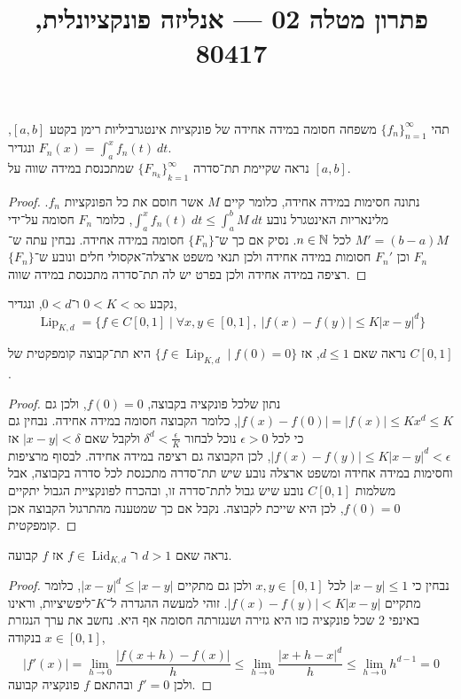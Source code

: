 
\title{פתרון מטלה 02 --- אנליזה פונקציונלית, 80417}


\maketitle
\maketitleprint{}

\question{}
תהי ${\{ f_n \}}_{n = 1}^\infty$ משפחה חסומה במידה אחידה של פונקציות אינטגרביליות רימן בקטע $[a, b]$, ונגדיר $F_n(x) = \int_{a}^{x} f_n(t)\ dt$. \\
נראה שקיימת תת־סדרה ${\{ F_{n_k} \}}_{k = 1}^\infty$ שמתכנסת במידה שווה על $[a, b]$.
\begin{proof}
	נתונה חסימות במידה אחידה, כלומר קיים $M$ אשר חוסם את כל הפונקציות $f_n$.
	מלינאריות האינטגרל נובע $\int_a^x f_n(t)\ dt \le \int_a^b M\ dt$, כלומר $F_n$ חסומה על־ידי $M' = (b - a)M$ לכל $n \in \mathbb{N}$.
	נסיק אם כך ש־$\{ F_n \}$ חסומה במידה אחידה.
	נבחין עתה ש־$F_n$ וכן $F_n'$ חסומות במידה אחידה ולכן תנאי משפט ארצלה־אקסולי חלים ונובע ש־$\{ F_n \}$ רציפה במידה אחידה ולכן בפרט יש לה תת־סדרה מתכנסת במידה שווה.
\end{proof}

\question{}
נקבע $0 < K < \infty$ ו־$0 < d$, ונגדיר,
\[
	\operatorname{Lip}_{K, d}
	= \{ f \in C[0, 1] \mid \forall x, y \in [0, 1],\ |f(x) - f(y)| \le K {|x - y|}^d \}  
\] 

\subquestion{}
נראה שאם $d \le 1$, אז $\{ f \in \operatorname{Lip}_{K, d} \mid f(0) = 0 \}$ היא תת־קבוצה קומפקטית של $C[0, 1]$.
\begin{proof}
	נתון שלכל פונקציה בקבוצה, $f(0) = 0$, ולכן גם $|f(x) - f(0)| = |f(x)| \le K x^d \le K$, כלומר הקבוצה חסומה במידה אחידה.
	נבחין גם כי לכל $\epsilon > 0$ נוכל לבחור $\delta^d < \frac{\epsilon}{K}$ ולקבל שאם $|x - y| < \delta$ אז $|f(x) - f(y)| \le K{|x - y|}^d < \epsilon$, לכן הקבוצה גם רציפה במידה אחידה.
	לבסוף מרציפות וחסימות במידה אחידה ומשפט ארצלה נובע שיש תת־סדרה מתכנסת לכל סדרה בקבוצה, אבל משלמות $C[0, 1]$ נובע שיש גבול לתת־סדרה זו, ובהכרח לפונקציית הגבול יתקיים $f(0) = 0$, לכן היא שייכת לקבוצה.
	נקבל אם כך שמטענה מהתרגול הקבוצה אכן קומפקטית.
\end{proof}

\subquestion{}
נראה שאם $d > 1$ ו־$f \in \operatorname{Lid}_{K, d}$ אז $f$ קבועה.
\begin{proof}
	נבחין כי $|x - y| \le 1$ לכל $x, y \in [0, 1]$ ולכן גם מתקיים ${|x - y|}^d \le |x - y|$, כלומר מתקיים $|f(x) - f(y)| < K|x - y|$.
	זוהי למעשה ההגדרה ל־$K$־ליפשיציות, וראינו באינפי 2 שכל פונקציה כזו היא גזירה ושנגזרתה חסומה אף היא.
	נחשב את ערך הנגזרת בנקודה $x \in [0, 1]$,
	\[
		|f'(x)|
		= \lim_{h \to 0} \frac{|f(x + h) - f(x)|}{h}
		\le \lim_{h \to 0} \frac{{|x + h - x|}^d}{h}
		\le \lim_{h \to 0} h^{d - 1}
		= 0
	\]
	ולכן $f' = 0$ ובהתאם $f$ פונקציה קבועה.
\end{proof}

